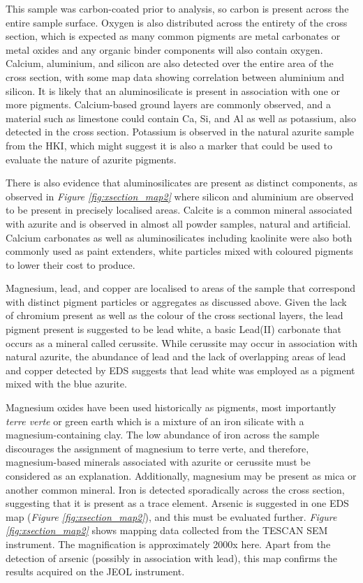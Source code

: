 This sample was carbon-coated prior to analysis, so carbon is present across the entire sample surface. Oxygen is also distributed across the entirety of the cross section, which is expected as many common pigments are metal carbonates or metal oxides and any organic binder components will also contain oxygen. Calcium, aluminium, and silicon are also detected over the entire area of the cross section, with some map data showing correlation between aluminium and silicon. It is likely that an aluminosilicate is present in association with one or more pigments. Calcium-based ground layers are commonly observed, and a material such as limestone could contain Ca, Si, and Al as well as potassium, also detected in the cross section. Potassium is observed in the natural azurite sample from the HKI, which might suggest it is also a marker that could be used to evaluate the nature of azurite pigments.

There is also evidence that aluminosilicates are present as distinct components, as observed in \textit{Figure \ref{fig:xsection_map2}} where silicon and aluminium are observed to be present in precisely localised areas. Calcite is a common mineral associated with azurite and is observed in almost all powder samples, natural and artificial. Calcium carbonates as well as aluminosilicates including kaolinite were also both commonly used as paint extenders, white particles mixed with coloured pigments to lower their cost to produce.~\autocite{Townsend}

Magnesium, lead, and copper are localised to areas of the sample that correspond with distinct pigment particles or aggregates as discussed above. Given the lack of chromium present as well as the colour of the cross sectional layers, the lead pigment present is suggested to be lead white, a basic Lead(II) carbonate that occurs as a mineral called cerussite. While cerussite may occur in association with natural azurite,\autocite{Aru} the abundance of lead and the lack of overlapping areas of lead and copper detected by EDS suggests that lead white was employed as a pigment mixed with the blue azurite.

Magnesium oxides have been used historically as pigments, most importantly \textit{terre verte} or green earth which is a mixture of an iron silicate with a magnesium-containing clay. The low abundance of iron across the sample discourages the assignment of magnesium to terre verte, and therefore, magnesium-based minerals associated with azurite or cerussite must be considered as an explanation. Additionally, magnesium may be present as mica or another common mineral. Iron is detected sporadically across the cross section, suggesting that it is present as a trace element. Arsenic is suggested in one EDS map (\textit{Figure \ref{fig:xsection_map2}}), and this must be evaluated further. \textit{Figure \ref{fig:xsection_map2}} shows mapping data collected from the TESCAN SEM instrument. The magnification is approximately 2000x here. Apart from the detection of arsenic (possibly in association with lead), this map confirms the results acquired on the JEOL instrument.

